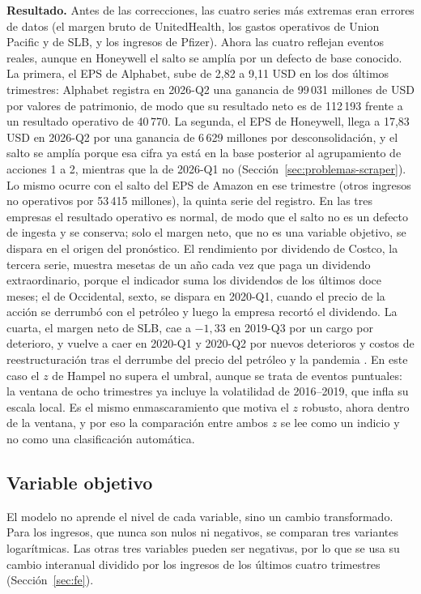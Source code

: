 \documentclass[12pt,letterpaper,oneside]{report}
\renewcommand{\_}{\UnderscoreOriginal\allowbreak}
\begin{document}
\textbf{Resultado.} Antes de las correcciones, las cuatro series más extremas eran errores de datos (el margen bruto de UnitedHealth, los gastos operativos de Union Pacific y de SLB, y los ingresos de Pfizer). Ahora las cuatro reflejan eventos reales, aunque en Honeywell el salto se amplía por un defecto de base conocido. La primera, el EPS de Alphabet, sube de 2,82 a 9,11 USD en los dos últimos trimestres: Alphabet registra en 2026-Q2 una ganancia de 99\,031 millones de USD por valores de patrimonio, de modo que su resultado neto es de 112\,193 frente a un resultado operativo de 40\,770. La segunda, el EPS de Honeywell, llega a 17,83 USD en 2026-Q2 por una ganancia de 6\,629 millones por desconsolidación, y el salto se amplía porque esa cifra ya está en la base posterior al agrupamiento de acciones 1 a 2, mientras que la de 2026-Q1 no (Sección~\ref{sec:problemas-scraper}). Lo mismo ocurre con el salto del EPS de Amazon en ese trimestre (otros ingresos no operativos por 53\,415 millones), la quinta serie del registro. En las tres empresas el resultado operativo es normal, de modo que el salto no es un defecto de ingesta y se conserva; solo el margen neto, que no es una variable objetivo, se dispara en el origen del pronóstico. El rendimiento por dividendo de Costco, la tercera serie, muestra mesetas de un año cada vez que paga un dividendo extraordinario, porque el indicador suma los dividendos de los últimos doce meses; el de Occidental, sexto, se dispara en 2020-Q1, cuando el precio de la acción se derrumbó con el petróleo y luego la empresa recortó el dividendo. La cuarta, el margen neto de SLB, cae a $-1{,}33$ en 2019-Q3 por un cargo por deterioro, y vuelve a caer en 2020-Q1 y 2020-Q2 por nuevos deterioros y costos de reestructuración tras el derrumbe del precio del petróleo y la pandemia \parencite{slb2020q1, slb2020q2}. En este caso el $z$ de Hampel no supera el umbral, aunque se trata de eventos puntuales: la ventana de ocho trimestres ya incluye la volatilidad de 2016--2019, que infla su escala local. Es el mismo enmascaramiento que motiva el $z$ robusto, ahora dentro de la ventana, y por eso la comparación entre ambos $z$ se lee como un indicio y no como una clasificación automática.

\subsection{Variable objetivo}

El modelo no aprende el nivel de cada variable, sino un cambio transformado. Para los ingresos, que nunca son nulos ni negativos, se comparan tres variantes logarítmicas. Las otras tres variables pueden ser negativas, por lo que se usa su cambio interanual dividido por los ingresos de los últimos cuatro trimestres (Sección~\ref{sec:fe}).
\end{document}
